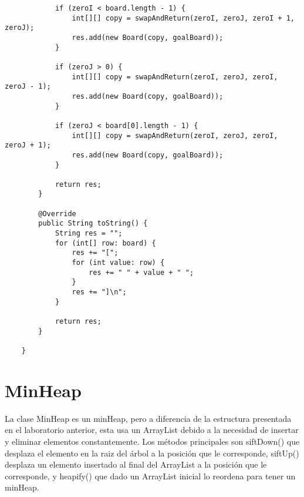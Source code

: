 \documentclass[paper=a4, fontsize=11pt]{scrartcl} %
\numberwithin{equation}{section} %
\numberwithin{figure}{section} %
\numberwithin{table}{section} %
\begin{document}
\begin{lstlisting}
            if (zeroI < board.length - 1) {
                int[][] copy = swapAndReturn(zeroI, zeroJ, zeroI + 1, zeroJ);
                res.add(new Board(copy, goalBoard));
            }

            if (zeroJ > 0) {
                int[][] copy = swapAndReturn(zeroI, zeroJ, zeroI, zeroJ - 1);
                res.add(new Board(copy, goalBoard));
            }

            if (zeroJ < board[0].length - 1) {
                int[][] copy = swapAndReturn(zeroI, zeroJ, zeroI, zeroJ + 1);
                res.add(new Board(copy, goalBoard));
            }

            return res;
        }

        @Override
        public String toString() {
            String res = "";
            for (int[] row: board) {
                res += "[";
                for (int value: row) {
                    res += " " + value + " ";
                }
                res += "]\n";
            }

            return res;
        }

    }

    \end{lstlisting}

    \section{MinHeap}\label{sec:minheap}

    La clase MinHeap es un minHeap, pero a diferencia de la estructura presentada en el laboratorio
    anterior, esta usa un ArrayList debido a la necesidad de insertar y eliminar elementos
    constantemente.
    Los métodos principales son siftDown() que desplaza el elemento en la raiz del árbol a la
    posición que le corresponde, siftUp() desplaza un elemento insertado al final del ArrayList a la
    posición que le corresponde, y heapify() que dado un ArrayList inicial lo reordena para
    tener un minHeap.
\end{document}
